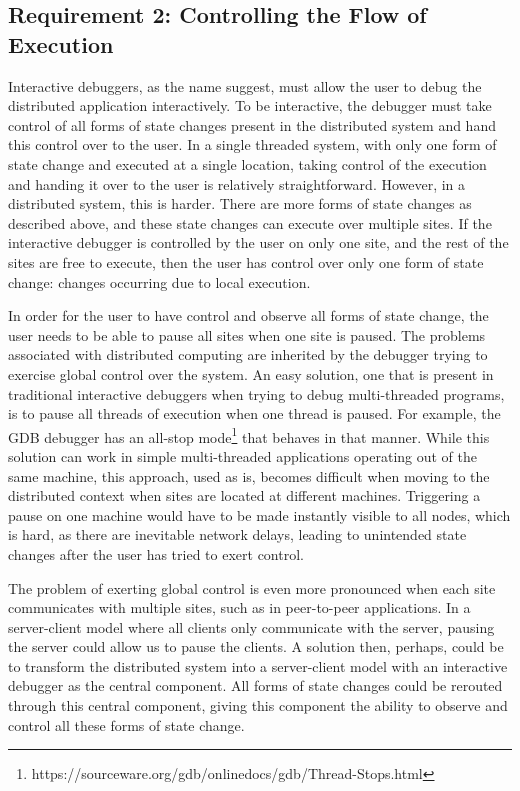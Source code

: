 \subsection{Requirement 2: Controlling the Flow of Execution}
\label{subsec:req2}

Interactive debuggers, as the name suggest, must allow the user to debug the distributed application interactively. To be interactive, the debugger must take control of all forms of state changes present in the distributed system and hand this control over to the user. In a single threaded system, with only one form of state change and executed at a single location, taking control of the execution and handing it over to the user is relatively straightforward. However, in a distributed system, this is harder. There are more forms of state changes as described above, and these state changes can execute over multiple sites. If the interactive debugger is controlled by the user on only one site, and the rest of the sites are free to execute, then the user has control over only one form of state change: changes occurring due to local execution.

In order for the user to have control and observe all forms of state change, the user needs to be able to pause all sites when one site is paused. The problems associated with distributed computing are inherited by the debugger trying to exercise global control over the system. An easy solution, one that is present in traditional interactive debuggers when trying to debug multi-threaded programs, is to pause all threads of execution when one thread is paused. For example, the GDB debugger has an all-stop mode\footnote{https://sourceware.org/gdb/onlinedocs/gdb/Thread-Stops.html} that behaves in that manner. While this solution can work in simple multi-threaded applications operating out of the same machine, this approach, used as is, becomes difficult when moving to the distributed context when sites are located at different machines. Triggering a pause on one machine would have to be made instantly visible to all nodes, which is hard, as there are inevitable network delays, leading to unintended state changes after the user has tried to exert control.

The problem of exerting global control is even more pronounced when each site communicates with multiple sites, such as in peer-to-peer applications. In a server-client model where all clients only communicate with the server, pausing the server could allow us to pause the clients. A solution then, perhaps, could be to transform the distributed system into a server-client model with an interactive debugger as the central component. All forms of state changes could be rerouted through this central component, giving this component the ability to observe and control all these forms of state change.


